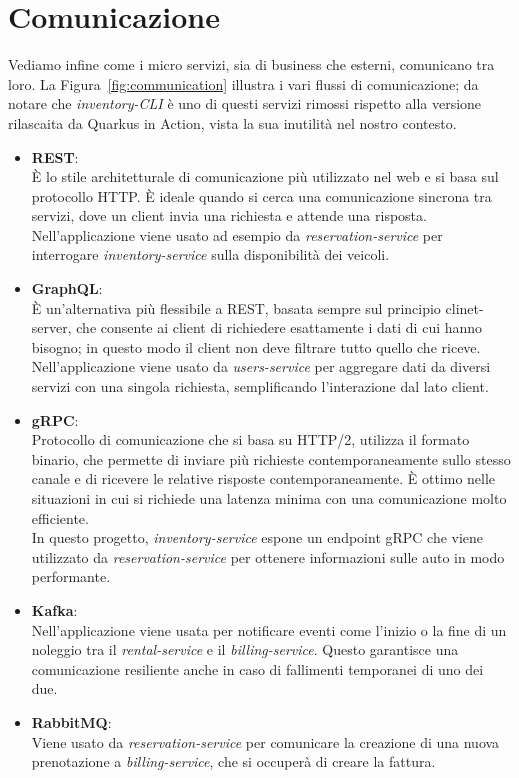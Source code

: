 \section{Comunicazione}
Vediamo infine come i micro servizi, sia di business che esterni, comunicano tra loro. La Figura~\ref{fig:communication} illustra i vari flussi di comunicazione; da notare che \textit{inventory-CLI} è uno di questi servizi rimossi rispetto alla versione rilascaita da Quarkus in Action, vista la sua inutilità nel nostro contesto.
\begin{itemize}
    \item \textbf{REST}: \\
        È lo stile architetturale di comunicazione più utilizzato nel web e si basa sul protocollo HTTP. È ideale quando si cerca una comunicazione sincrona tra servizi, dove un client invia una richiesta e attende una risposta. \\
        Nell'applicazione viene usato ad esempio da \textit{reservation-service} per interrogare \textit{inventory-service} sulla disponibilità dei veicoli.
    \item \textbf{GraphQL}: \\
        È un'alternativa più flessibile a REST, basata sempre sul principio clinet-server, che consente ai client di richiedere esattamente i dati di cui hanno bisogno; in questo modo il client non deve filtrare tutto quello che riceve. \\
        Nell'applicazione viene usato da \textit{users-service} per aggregare dati da diversi servizi con una singola richiesta, semplificando l'interazione dal lato client.
    \item \textbf{gRPC}: \\
        Protocollo di comunicazione che si basa su HTTP/2, utilizza il formato binario, che permette di inviare più richieste contemporaneamente sullo stesso canale e di ricevere le relative risposte contemporaneamente. È ottimo nelle situazioni in cui si richiede una latenza minima con una comunicazione molto efficiente. \\
        In questo progetto, \textit{inventory-service} espone un endpoint gRPC che viene utilizzato da \textit{reservation-service} per ottenere informazioni sulle auto in modo performante.
    \item \textbf{Kafka}: \\
        Nell'applicazione viene usata per notificare eventi come l'inizio o la fine di un noleggio tra il \textit{rental-service} e il \textit{billing-service}. Questo garantisce una comunicazione resiliente anche in caso di fallimenti temporanei di uno dei due.
    \item \textbf{RabbitMQ}: \\
        Viene usato da \textit{reservation-service} per comunicare la creazione di una nuova prenotazione a \textit{billing-service}, che si occuperà di creare la fattura.
\end{itemize}

